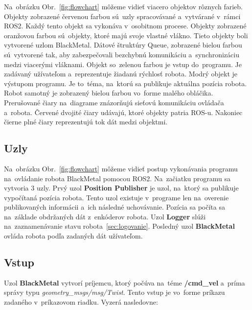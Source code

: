 Na~obrázku Obr.~\ref{fig:flowchart} môžeme vidieť viacero objektov rôznych farieb. Objekty zobrazené
červenou farbou sú~uzly spracovávané a~vytvárané v~rámci ROS2. Každý tento objekt sa vykonáva
v~osobitnom procese. Objekty zobrazené oranžovou farbou sú~objekty, ktoré majú svoje
vlastné vlákno.
Tieto objekty boli vytvorené uzlom BlackMetal. Dátové štruktúry Queue, zobrazené bielou farbou
sú~vytvorené tak, aby zabezpečovali bezchybnú komunikáciu a~synchronizáciu medzi viacerými
vláknami. Objekt so~zelenou farbou je vstup do~programu. Je zadávaný užívateľom a~reprezentuje
žiadanú rýchlosť robota. Modrý objekt je výstupom programu. Je to~téma, na~ktorú sa publikuje
aktuálna pozícia robota. Robot samotný je zobrazený bielou farbou vo~forme malého obláčika.
Prerušované čiary na~diagrame znázorňujú sieťovú komunikáciu ovládača a~robota. Červené dvojité
čiary udávajú, ktoré objekty patria ROS-u. Nakoniec čierne plné čiary reprezentujú tok dát medzi
objektmi.

\subsection{Uzly}
\label{subsec:nodes}

Na~obrázku Obr.~\ref{fig:flowchart} môžeme vidieť postup vykonávania programu na~ovládanie
robota BlackMetal pomocou ROS2. Na~začiatku programu sa vytvoria 3 uzly. Prvý uzol
\textbf{Position Publisher} je uzol, na~ktorý sa publikuje vypočítaná pozícia robota.
Tento uzol existuje v~programe len na~overenie publikovaných informácii a~ich následné uchovávanie.
Pozícia sa počíta sa na~základe obdržaných dát z~enkóderov robota. Uzol \textbf{Logger} slúži na~zaznamenávanie
stavu robota~\ref{sec:logovanie}. Posledný uzol \textbf{BlackMetal} ovláda robota podľa
zadaných dát užívateľom.

\subsection{Vstup}
\label{subsec:input}

Uzol \textbf{BlackMetal} vytvorí príjemcu, ktorý počúva na~téme \textbf{/cmd\_vel} a~príma správy typu
\textit{geometry\_msgs/msg/Twist}. Tento vstup je vo~forme príkazu zadaného v~príkazovom riadku. Vyzerá nasledovne:


